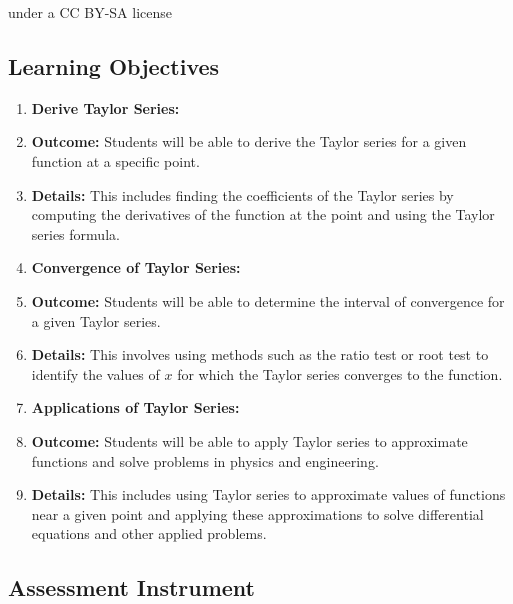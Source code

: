     under a CC BY-SA license

\subsection{Learning Objectives}

\begin{enumerate}
    \item \textbf{Derive Taylor Series:}
    \item \textbf{Outcome:} Students will be able to derive the Taylor series for a given function at a specific point.
    \item \textbf{Details:} This includes finding the coefficients of the Taylor series by computing the derivatives of the function at the point and using the Taylor series formula.
    \item \textbf{Convergence of Taylor Series:}
    \item \textbf{Outcome:} Students will be able to determine the interval of convergence for a given Taylor series.
    \item \textbf{Details:} This involves using methods such as the ratio test or root test to identify the values of $x$ for which the Taylor series converges to the function.
    \item \textbf{Applications of Taylor Series:}
    \item \textbf{Outcome:} Students will be able to apply Taylor series to approximate functions and solve problems in physics and engineering.
    \item \textbf{Details:} This includes using Taylor series to approximate values of functions near a given point and applying these approximations to solve differential equations and other applied problems.
\end{enumerate}

\subsection{Assessment Instrument}

